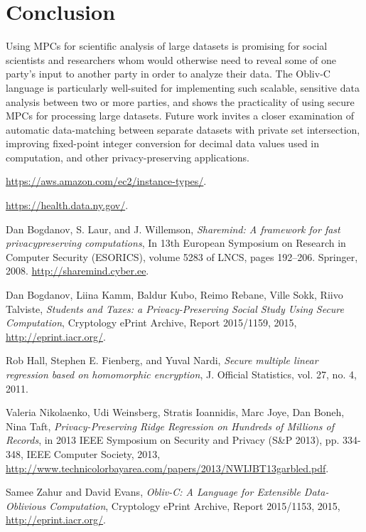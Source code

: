 \documentclass[conference]{IEEEtran}
\begin{document}
\section{Conclusion}
Using MPCs for scientific analysis of large datasets is promising for social scientists
and researchers whom would otherwise need to reveal some of one party's input to another
party in order to analyze their data. 
The Obliv-C language is particularly well-suited for implementing such scalable, 
sensitive data analysis between two or more parties, and shows the practicality of 
using secure MPCs for processing large datasets.
Future work invites a closer examination of automatic data-matching between
separate datasets with private set intersection, improving fixed-point integer 
conversion for decimal data values used in computation, and other privacy-preserving
applications.

\begin{thebibliography}{1}

  \url{https://aws.amazon.com/ec2/instance-types/}.

  \url{https://health.data.ny.gov/}.

Dan Bogdanov, S. Laur, and J. Willemson,
\emph{Sharemind: A framework for fast privacypreserving
computations}, In 13th European Symposium on Research in Computer
Security (ESORICS), volume 5283 of LNCS, pages 192–206. Springer, 2008.
\url{http://sharemind.cyber.ee}.

    Dan Bogdanov, Liina Kamm, Baldur Kubo, Reimo Rebane, Ville Sokk, Riivo Talviste,
    \emph{Students and Taxes: a Privacy-Preserving Social Study Using Secure Computation},
    Cryptology ePrint Archive, Report 2015/1159,
    2015,
    \url{http://eprint.iacr.org/}.

  Rob Hall, Stephen E. Fienberg, and Yuval Nardi, 
  \emph{Secure multiple linear regression based on homomorphic encryption}, 
  J. Official Statistics, vol. 27, no. 4, 2011.

 Valeria Nikolaenko, Udi Weinsberg, Stratis Ioannidis, Marc Joye, Dan Boneh, Nina Taft,
 \emph{Privacy-Preserving Ridge Regression on Hundreds of Millions of Records},
 in 2013 IEEE Symposium on Security and Privacy (S\&P 2013), pp. 334-348, 
 IEEE Computer Society, 2013,
 \url{http://www.technicolorbayarea.com/papers/2013/NWIJBT13garbled.pdf}.

  Samee Zahur and David Evans, \emph{Obliv-C: A Language for Extensible 
  Data-Oblivious Computation}, Cryptology ePrint Archive, 
  Report 2015/1153, 2015, 
  \url{http://eprint.iacr.org/}.

\end{thebibliography}
\end{document}
